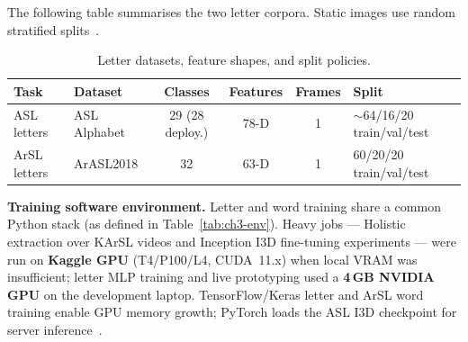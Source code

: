 \noindent The following table summarises the two letter corpora. Static images use random stratified splits~\cite{akash2019aslalphabet,arthur2018arasl2018}.\par\vspace{0.4cm}

\begin{table}[H]
\centering
\caption{Letter datasets, feature shapes, and split policies.}
\label{tab:ch3-letter-datasets}
\small
\begin{tabular}{|P{1.5cm}|P{2.2cm}|c|c|c|P{2.8cm}|}
\hline
\textbf{Task} & \textbf{Dataset} & \textbf{Classes} & \textbf{Features} & \textbf{Frames} & \textbf{Split} \\
\hline
ASL letters & ASL Alphabet & 29 (28 deploy.) & 78-D & 1 & $\sim$64/16/20 train/val/test \\
ArSL letters & ArASL2018 & 32 & 63-D & 1 & 60/20/20 train/val/test \\
\hline
\end{tabular}
\end{table}
\vspace{0.4cm}

\noindent\textbf{Training software environment.} Letter and word training share a common Python stack (as defined in Table~\ref{tab:ch3-env}). Heavy jobs --- Holistic extraction over KArSL videos and Inception I3D fine-tuning experiments --- were run on \textbf{Kaggle GPU} (T4/P100/L4, CUDA~11.x) when local VRAM was insufficient; letter MLP training and live prototyping used a \textbf{4\,GB NVIDIA GPU} on the development laptop. TensorFlow/Keras letter and ArSL word training enable GPU memory growth; PyTorch loads the ASL I3D checkpoint for server inference~\cite{abadi2016tensorflow,chollet2015keras,kingma2015adam}.\par\vspace{0.3cm}

